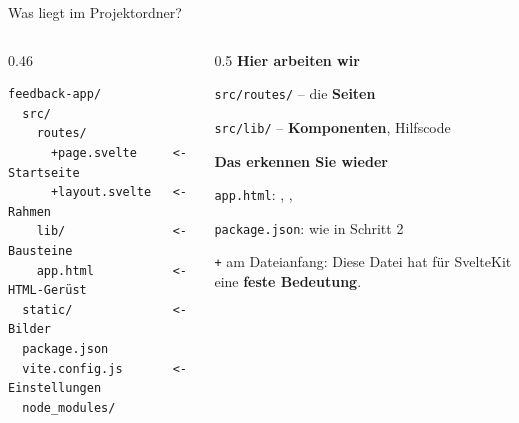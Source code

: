 \begin{frame}[fragile]{Was liegt im Projektordner?}
  \begin{columns}[onlytextwidth,t]
    \begin{column}{0.46\textwidth}
\begin{lstlisting}[style=term]
feedback-app/
  src/
    routes/
      +page.svelte     <- Startseite
      +layout.svelte   <- Rahmen
    lib/               <- Bausteine
    app.html           <- HTML-Gerüst
  static/              <- Bilder
  package.json
  vite.config.js       <- Einstellungen
  node_modules/
\end{lstlisting}
    \end{column}
    \begin{column}{0.5\textwidth}
      \footnotesize
      \textbf{Hier arbeiten wir}
      \begin{tugitemize}
        \item[\itemArrow] \texttt{src/routes/} -- die \textbf{Seiten}
        \item[\itemArrow] \texttt{src/lib/} -- \textbf{Komponenten}, Hilfscode
      \end{tugitemize}
      \vspace{0.3em}
      \textbf{Das erkennen Sie wieder}
      \begin{tugitemize}
        \item \texttt{app.html}: , , 
        \item \texttt{package.json}: wie in Schritt 2
      \end{tugitemize}
      \vspace{0.3em}
      \texttt{+} am Dateianfang: Diese Datei hat für SvelteKit eine
      \textbf{feste Bedeutung}.
    \end{column}
  \end{columns}
\end{frame}

